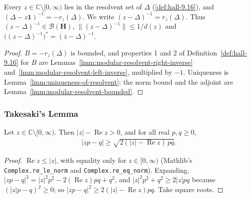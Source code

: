 \begin{corollary}
    \label{crllr:modular-resolvent}
    \leanok
    Every $z \in \mathbb{C} \setminus [0, \infty)$ lies in the resolvent set of $\Delta$ (\ref{def:hall-9.16}), and $(\Delta - z\mathbf{1})^{-1} = -r_z(\Delta)$. We write $(z - \Delta)^{-1} = r_z(\Delta)$. Thus $(z - \Delta)^{-1} \in \mathcal{B}(\mathbf{H})$, $\|(z - \Delta)^{-1}\| \le 1/d(z)$ and $\big( (z - \Delta)^{-1} \big)^* = (\overline{z} - \Delta)^{-1}$.
\end{corollary}
\begin{proof}
    \leanok
    $B = -r_z(\Delta)$ is bounded, and properties 1 and 2 of Definition~\ref{def:hall-9.16} for $B$ are Lemmas~\ref{lmm:modular-resolvent-right-inverse} and~\ref{lmm:modular-resolvent-left-inverse}, multiplied by $-1$. Uniqueness is Lemma~\ref{lmm:uniqueness-of-resolvent}; the norm bound and the adjoint are Lemma~\ref{lmm:modular-resolvent-bounded}.
\end{proof}

\subsubsection{Takesaki's Lemma}

\begin{lemma}
    \label{lmm:takesaki-elementary-inequality}
    \leanok
    Let $z \in \mathbb{C} \setminus [0, \infty)$. Then $|z| - \operatorname{Re} z > 0$, and for all real $p, q \ge 0$,
    \begin{align}
        |zp - q| \ge \sqrt{2(|z| - \operatorname{Re} z)\, pq}.
    \end{align}
\end{lemma}
\begin{proof}
    \leanok
    $\operatorname{Re} z \le |z|$, with equality only for $z \in [0, \infty)$ (Mathlib's \texttt{Complex.re\_le\_norm} and \texttt{Complex.re\_eq\_norm}). Expanding, $|zp - q|^2 = |z|^2p^2 - 2(\operatorname{Re} z)pq + q^2$, and $|z|^2p^2 + q^2 \ge 2|z|pq$ because $(|z|p - q)^2 \ge 0$; so $|zp - q|^2 \ge 2(|z| - \operatorname{Re} z)pq$. Take square roots.
\end{proof}

